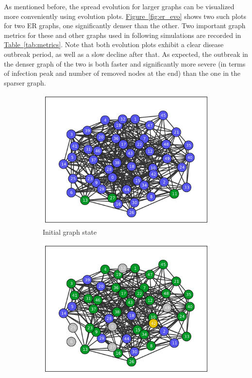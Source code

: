 \documentclass[11pt]{article} %
\newcommand{\figref}[1]{\mbox{Figure~\ref{#1}}}
\newcommand{\tabref}[1]{\mbox{Table~\ref{#1}}}
\renewcommand{\figref}[1]{\hyperref[#1]{\mbox{Figure~\ref*{#1}}}}
\renewcommand{\tabref}[1]{\hyperref[#1]{\mbox{Table~\ref*{#1}}}}
\begin{document}
As mentioned before, the spread evolution for larger graphs can be visualized
more conveniently using evolution plots. \figref{fig:er_evo} shows two such
plots for two ER graphs, one significantly denser than the other. Two important
graph metrics for these and other graphs used in following simulations are
recorded in \tabref{tab:metrics}. Note that both evolution plots exhibit
a clear disease outbreak period, as well as a slow decline after that.
As expected, the outbreak in the denser graph of the two is both faster and
significantly more severe (in terms of infection peak and number of removed nodes
at the end) than the one in the sparser graph.

\begin{figure}[tbp]
  \begin{subfigure}[b]{0.5\textwidth}
    \centering
    \includegraphics[width=\textwidth]{figures/evo_ER_50_03_init}
    \caption{Initial graph state}
  \end{subfigure}
  \begin{subfigure}[b]{0.5\textwidth}
    \centering
    \includegraphics[width=\textwidth]{figures/evo_ER_50_03_10}

\end{subfigure}
\end{figure}
\end{document}
